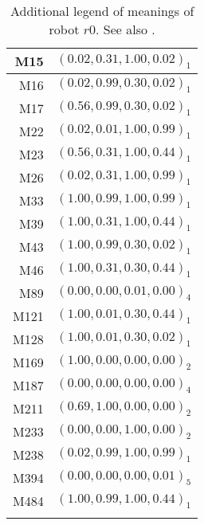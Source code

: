 \begin{table}[h]
\centering
{\footnotesize\begin{tabular}{rc}
\lsptoprule
M15 & $(0.02,0.31,1.00,0.02)_1$\\\hline
M16 & $(0.02,0.99,0.30,0.02)_1$\\\hline
M17 & $(0.56,0.99,0.30,0.02)_1$\\\hline
M22 & $(0.02,0.01,1.00,0.99)_1$\\\hline
M23 & $(0.56,0.31,1.00,0.44)_1$\\\hline
M26 & $(0.02,0.31,1.00,0.99)_1$\\\hline
M33 & $(1.00,0.99,1.00,0.99)_1$\\\hline
M39 & $(1.00,0.31,1.00,0.44)_1$\\\hline
M43 & $(1.00,0.99,0.30,0.02)_1$\\\hline
M46 & $(1.00,0.31,0.30,0.44)_1$\\\hline
M89 & $(0.00,0.00,0.01,0.00)_4$\\\hline
M121 & $(1.00,0.01,0.30,0.44)_1$\\\hline
M128 & $(1.00,0.01,0.30,0.02)_1$\\\hline
M169 & $(1.00,0.00,0.00,0.00)_2$\\\hline
M187 & $(0.00,0.00,0.00,0.00)_4$\\\hline
M211 & $(0.69,1.00,0.00,0.00)_2$\\\hline
M233 & $(0.00,0.00,1.00,0.00)_2$\\\hline
M238 & $(0.02,0.99,1.00,0.99)_1$\\\hline
M394 & $(0.00,0.00,0.00,0.01)_5$\\\hline
M484 & $(1.00,0.99,1.00,0.44)_1$\\
\lspbottomrule
\end{tabular}}
\caption{Additional legend of meanings of robot $r0$. See also .}
\label{t:st:legend0a}
\end{table}

